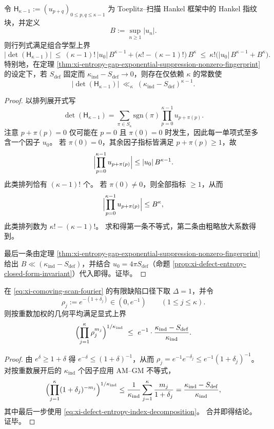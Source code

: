 \begin{proposition}\label{prop:xi-entropy-gap-hankel-determinant-collapse-upper-bound}
令 \(\mathsf H_{\kappa-1}:=(u_{p+q})_{0\le p,q\le \kappa-1}\) 为 Toeplitz--扫描 Hankel 框架中的 Hankel 指纹块，并定义
\[
B:=\sup_{n\ge 1}|u_n|.
\]
则行列式满足组合学型上界
\[
|\det(\mathsf H_{\kappa-1})|
\ \le\
(\kappa-1)!\,|u_0|\,B^{\kappa-1}+\bigl(\kappa!-(\kappa-1)!\bigr)\,B^{\kappa}
\ \le\
\kappa!\bigl(|u_0|\,B^{\kappa-1}+B^{\kappa}\bigr).
\]
特别地，在定理 \ref{thm:xi-entropy-gap-exponential-suppression-nonzero-fingerprint} 的设定下，若 \(S_{\mathrm{def}}\) 固定而 \(\kappa_{\mathrm{ind}}-S_{\mathrm{def}}\to 0\)，则存在仅依赖 \(\kappa\) 的常数使
\[
|\det(\mathsf H_{\kappa-1})|\ \ll_{\kappa}\ (\kappa_{\mathrm{ind}}-S_{\mathrm{def}})^{\kappa-1}.
\]
\end{proposition}
\begin{proof}
以排列展开式写
\[
\det(\mathsf H_{\kappa-1})
=\sum_{\pi\in S_{\kappa}}\mathrm{sgn}(\pi)\prod_{p=0}^{\kappa-1}u_{p+\pi(p)}.
\]
注意 \(p+\pi(p)=0\) 仅可能在 \(p=0\) 且 \(\pi(0)=0\) 时发生，因此每一单项式至多含一个因子 \(u_0\)。
若 \(\pi(0)=0\)，其余因子指标皆满足 \(p+\pi(p)\ge 1\)，故
\[
\Bigl|\prod_{p=0}^{\kappa-1}u_{p+\pi(p)}\Bigr|
\le
|u_0|\,B^{\kappa-1}.
\]
此类排列恰有 \((\kappa-1)!\) 个。
若 \(\pi(0)\neq 0\)，则全部指标 \(\ge 1\)，从而
\[
\Bigl|\prod_{p=0}^{\kappa-1}u_{p+\pi(p)}\Bigr|
\le
B^{\kappa},
\]
此类排列数为 \(\kappa!-(\kappa-1)!\)。
求和得第一条不等式，第二条由粗略放大系数得到。
\par
最后一条由定理 \ref{thm:xi-entropy-gap-exponential-suppression-nonzero-fingerprint} 给出 \(B\ll (\kappa_{\mathrm{ind}}-S_{\mathrm{def}})\)，并结合 \(u_0=4\pi S_{\mathrm{def}}\)（命题 \ref{prop:xi-defect-entropy-closed-form-invariant}）代入即得。证毕。
\end{proof}

\begin{proposition}[熵缺口控制节点模长的加权几何平均]\label{prop:xi-entropy-gap-controls-geometric-mean-radius}
在 \eqref{eq:xi-comoving-scan-fourier} 的有限缺陷口径下取 \(\Delta=1\)，并令
\[
\rho_j:=e^{-(1+\delta_j)}\in(0,e^{-1})\qquad(1\le j\le \kappa).
\]
则按重数加权的几何平均满足显式上界
\[
\Bigl(\prod_{j=1}^{\kappa}\rho_j^{m_j}\Bigr)^{1/\kappa_{\mathrm{ind}}}
\ \le\
e^{-1}\cdot\frac{\kappa_{\mathrm{ind}}-S_{\mathrm{def}}}{\kappa_{\mathrm{ind}}}.
\]
\end{proposition}
\begin{proof}
由 \(e^{\delta}\ge 1+\delta\) 得 \(e^{-\delta}\le (1+\delta)^{-1}\)，从而
\(
\rho_j=e^{-1}e^{-\delta_j}\le e^{-1}(1+\delta_j)^{-1}
\)。
对按重数展开后的 \(\kappa_{\mathrm{ind}}\) 个因子应用 AM--GM 不等式，
\[
\Bigl(\prod_{j=1}^{\kappa}(1+\delta_j)^{-m_j}\Bigr)^{1/\kappa_{\mathrm{ind}}}
\le
\frac{1}{\kappa_{\mathrm{ind}}}\sum_{j=1}^{\kappa}\frac{m_j}{1+\delta_j}
=\frac{\kappa_{\mathrm{ind}}-S_{\mathrm{def}}}{\kappa_{\mathrm{ind}}},
\]
其中最后一步使用 \eqref{eq:xi-defect-entropy-index-decomposition}。
合并即得结论。证毕。
\end{proof}

\endinput
